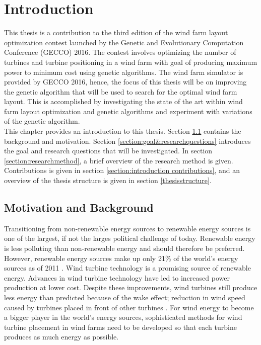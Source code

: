 \chapter{Introduction}\label{chapter:introduction}
This thesis is a contribution to the third edition of the wind farm layout optimization contest launched by the Genetic and Evolutionary Computation Conference (GECCO) 2016. The contest involves optimizing the number of turbines and turbine positioning in a wind farm with goal of producing maximum power to minimum cost using genetic algorithms. The wind farm simulator is provided by GECCO 2016, hence, the focus of this thesis will be on improving the genetic algorithm that will be used to search for the optimal wind farm layout. This is accomplished by investigating the state of the art within wind farm layout optimization and genetic algorithms and experiment with variations of the genetic algorithm.\\

\noindent This chapter provides an introduction to this thesis. Section \ref{section:motivation&background} contains the background and motivation. Section \ref{section:goal&researchquestions} introduces the goal and research questions that will be investigated. In section \ref{section:researchmethod}, a brief overview of the research method is given. Contributions is given in section \ref{section:introduction contributions}, and an overview of the thesis structure is given in section \ref{thesisstructure}.


\section{Motivation and Background}\label{section:motivation&background}
Transitioning from non-renewable energy sources to renewable energy sources is one of the largest, if not the larges political challenge of today. Renewable energy is less polluting than non-renewable energy and should therefore be preferred. However, renewable energy sources make up only 21\% of the world's energy sources as of 2011 \citep{url1}. Wind turbine technology is a promising source of renewable energy. Advances in wind turbine technology have led to increased power production at lower cost. Despite these improvements, wind turbines still produce less energy than predicted because of the wake effect; reduction in wind speed caused by turbines placed in front of other turbines \citep{Samorani}. For wind energy to become a bigger player in the world's energy sources, sophisticated methods for wind turbine placement in wind farms need to be developed so that each turbine produces as much energy as possible. \\

